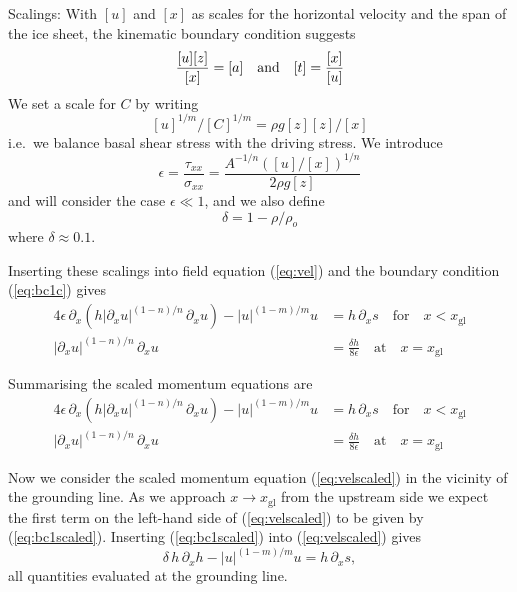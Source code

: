 \documentclass[10pt,a4paper]{book}
\newcommand{\p}{\partial}
\newcommand{\txx}{\tau_{xx}}
\newcommand{\sxx}{\sigma_{xx}}
\newcommand{\xgl}{x_{\mathrm{gl}}}
\begin{document}
Scalings: With $[u]$ and $[x]$ as scales for the horizontal velocity
and the span of the ice sheet, the kinematic boundary condition suggests
\[
\frac{[u] [z]}{[x]}= [a] \quad \hbox{and} \quad [t]=\frac{[x]}{[u]}
\]
We set a scale for $C$ by writing
\[
[u]^{1/m}/[C]^{1/m}=\rho g [z] [z]/[x]
\]
i.e.\ we balance basal shear stress with the driving stress.
We introduce
\begin{equation}
  \epsilon=\frac{\txx}{\sxx} = \frac{A^{-1/n} ([u]/[x])^{1/n}}{2 \rho g [z]} 
\end{equation}
and will consider the case $\epsilon \ll 1$, and we also define
\begin{equation}
  \delta=1-\rho/\rho_o  
\end{equation}
where $\delta\approx 0.1$.


Inserting these scalings into field equation (\ref{eq:vel}) and the boundary condition (\ref{eq:bc1c})
gives
\begin{align}
4 \epsilon \, \p_x \left (h |\p_x u|^{(1-n)/n} \, \p_x u \right ) - |u|^{(1-m)/m} u & = h \, \p_x s \quad \text{for} \quad x<\xgl \label{eq:velscaled}\\
|\p_x u|^{(1-n)/n} \, \p_x u&= \frac{\delta h}{8 \epsilon} \quad \text{at} \quad x=\xgl \label{eq:bc1scaled}
\end{align}




Summarising the scaled momentum equations are
\begin{align}
4 \epsilon \, \p_x \left (h |\p_x u|^{(1-n)/n} \, \p_x u \right ) - |u|^{(1-m)/m} u & = h \, \p_x s \quad \text{for} \quad x<\xgl \label{eq:velscaled2}\\
|\p_x u|^{(1-n)/n} \, \p_x u&= \frac{\delta h}{8 \epsilon} \quad \text{at} \quad x=\xgl \label{eq:bc1scaledb}
\end{align}


Now we consider the scaled momentum equation (\ref{eq:velscaled}) in the
vicinity of the grounding line. As we approach $x \to \xgl$ from
the upstream side we expect the first term on the left-hand side of
(\ref{eq:velscaled}) to be given by (\ref{eq:bc1scaled}). Inserting
(\ref{eq:bc1scaled}) into (\ref{eq:velscaled}) gives
\begin{equation}
\delta  \, h \, \p_x h   - |u|^{(1-m)/m} u  = h \, \p_x s ,
\label{eq:sc3}
\end{equation}
all quantities evaluated at the grounding line.
\end{document}
